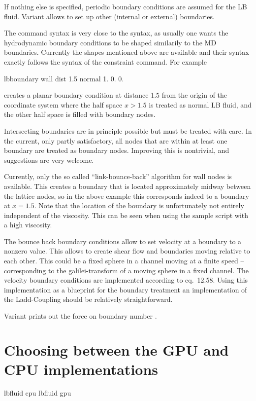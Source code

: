 If nothing else is specified, periodic boundary conditions are assumed
for the LB fluid. Variant  allows to set up other (internal
or external) boundaries.

The  command syntax is very close to the
 syntax, as usually one wants the hydrodynamic
boundary conditions to be shaped similarily to the MD
boundaries. Currently the shapes mentioned above are available and
their syntax exactly follows the syntax of the constraint command. For
example
\begin{tclcode}
  lbboundary wall dist 1.5 normal 1. 0. 0. 
\end{tclcode}
creates a planar boundary condition at distance 1.5 from the origin of
the coordinate system where the half space $x>1.5$ is treated as
normal LB fluid, and the other half space is filled with boundary
nodes.

Intersecting boundaries are in principle possible but must be treated
with care. 
In the current, only partly satisfactory, all nodes that are within at least
one boundary are treated as boundary nodes. Improving this is nontrivial, 
and suggestions are very welcome.

Currently, only the so called ``link-bounce-back'' algorithm for wall
nodes is available. This creates a boundary that is located
approximately midway between the lattice nodes, so in the above
example this corresponds indeed to a boundary at $x=1.5$. Note that
the location of the boundary is unfortunately not entirely independent of the
viscosity. This can \eg be seen when using the sample script
 with a high viscosity.

The bounce back boundary conditions allow to set velocity at a boundary to a nonzero
value. This allows to create shear flow and boundaries moving relative to 
each other. This could be a fixed sphere in a channel moving at a finite speed -- 
corresponding to the galilei-transform of a moving sphere in a fixed channel.
The velocity boundary conditions are implemented according to \cite{succi01a}
eq.~12.58. Using this implementation as a blueprint for the boundary treatment 
an implementation of the Ladd-Coupling should be relatively straightforward.

Variant  prints out the force on boundary number
.

\section{Choosing between the GPU and CPU implementations}
\begin{essyntax}
   lbfluid cpu
   lbfluid gpu
  \begin{features}
  \end{features}
\end{essyntax}

